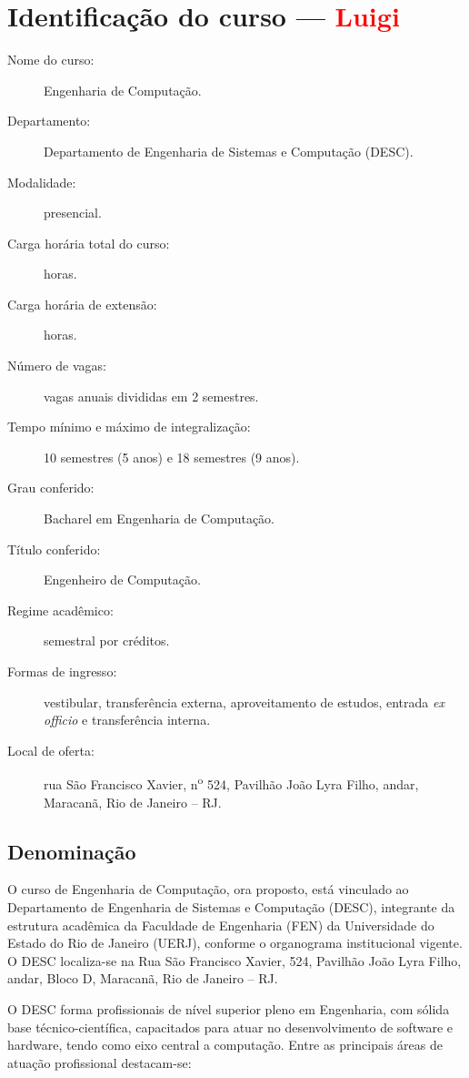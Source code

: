 \chapter{Identificação do curso --- \textcolor{red}{Luigi}}

\begin{description}
    \item [Nome do curso:] Engenharia de Computação.
    \item [Departamento:] Departamento de Engenharia de Sistemas e Computação (DESC).
    \item [Modalidade:] presencial.
    \item [Carga horária total do curso:] \tHorasCurso horas.
    \item [Carga horária de extensão:] \hExtensao horas.
    \item [Número de vagas:] \vagas vagas anuais divididas em 2 semestres.
    \item [Tempo mínimo e máximo de integralização:] 10 semestres (5 anos) e 18 semestres (9 anos).
    \item [Grau conferido:] Bacharel em Engenharia de Computação.
    \item [Título conferido:] Engenheiro de Computação.
    \item [Regime acadêmico:] semestral por créditos.
    \item [Formas de ingresso:] vestibular, transferência externa, aproveitamento de estudos, entrada \textit{ex officio} e transferência interna.
    \item [Local de oferta:] rua São Francisco Xavier, n\textsuperscript{o} 524, Pavilhão João Lyra Filho,  andar, Maracanã, Rio de Janeiro – RJ.
\end{description}
\section{Denominação}

O curso de Engenharia de Computação, ora proposto, está vinculado ao Departamento de Engenharia de Sistemas e Computação (DESC), integrante da estrutura acadêmica da Faculdade de Engenharia (FEN) da Universidade do Estado do Rio de Janeiro (UERJ), conforme o organograma institucional vigente. O DESC localiza-se na Rua São Francisco Xavier,  524, Pavilhão João Lyra Filho,  andar, Bloco D, Maracanã, Rio de Janeiro – RJ.

O DESC forma profissionais de nível superior pleno em Engenharia, com sólida base técnico-científica, capacitados para atuar no desenvolvimento de software e hardware, tendo como eixo central a computação. Entre as principais áreas de atuação profissional destacam-se:

